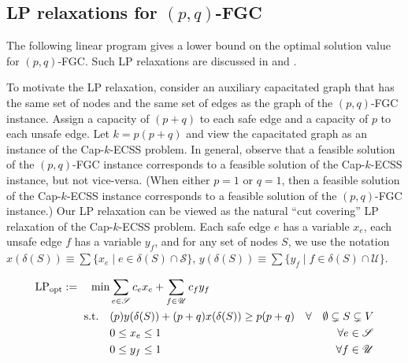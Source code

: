 \documentclass[11pt]{article}
\newcommand\lpopt{\hbox{\text{LP}$_{\text{opt}}$}}
\newcommand{\safe}{\mathscr{S}}
\newcommand{\unsafe}{\mathscr{U}}
\begin{document}
\subsection*{LP relaxations for $(p,q)$-FGC}
{
The following linear program gives a lower bound on the optimal solution value for $(p,q)$-FGC.
Such LP relaxations are discussed in \cite{BCHI23} and \cite[Section~2]{CJ23}.

To motivate the LP relaxation, consider an auxiliary capacitated graph
that has the same set of nodes and the same set of edges as the
graph of the $(p,q)$-FGC instance.
Assign a capacity of $(p+q)$ to each safe edge and a capacity of $p$ to each unsafe edge.
Let $k=p(p+q)$ and view the capacitated graph as an instance of the Cap-$k$-ECSS problem.
In general, observe that a feasible solution of the $(p,q)$-FGC instance corresponds
to a feasible solution of the Cap-$k$-ECSS instance, but not vice-versa.
(When either $p=1$ or $q=1$, then a feasible solution of the Cap-$k$-ECSS instance
corresponds to a feasible solution of the $(p,q)$-FGC instance.)
Our LP relaxation can be viewed as the natural ``cut covering'' LP relaxation
of the Cap-$k$-ECSS problem.
Each safe edge $e$ has a variable $x_e$, each unsafe edge $f$ has a variable $y_f$,
and for any set of nodes $S$, we use the notation
$x(\delta(S)) \equiv \sum\{x_e \mid e\in\delta(S)\cap\safe\}$,
$y(\delta(S)) \equiv \sum\{y_f \mid f\in\delta(S)\cap\unsafe\}$.

\begin{align}
	\lpopt := \quad \min  & \sum_{e \in \safe} c_e x_e + \sum_{f \in \unsafe} c_f y_f & \label{eq:obj} \\
	\text{s.t.} \quad & (p) y(\delta(S)) + (p+q) x(\delta(S)) \geq p(p+q)  & \forall \quad \emptyset \subsetneq S \subsetneq V \label{eq:twoec} \\
& 0 \leq x_e \leq 1 & \forall e\in\safe	\label{eq:nonneg} \\
& 0 \leq y_f \leq 1 & \forall f\in\unsafe
\end{align}
}
\end{document}
